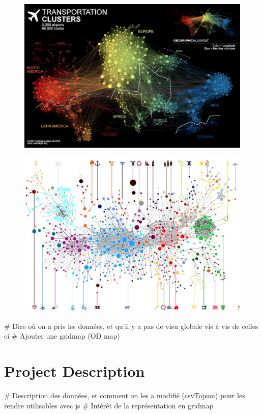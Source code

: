 \documentclass{vgtc}
\begin{document}
\begin{figure}[H]
\center
\includegraphics[scale=0.15]{airports-network-small.jpg}
\end{figure}

\begin{figure}[H]
\center
\includegraphics[scale=0.4]{economic_growth_atlas2.jpg}
\end{figure}

# Dire où on a pris les données, et qu'il y a pas de visu globale vis à vis de celles ci
# Ajouter une gridmap (OD map)

\section{Project Description}
# Description des données, et comment on les a modifié (csvTojson) pour les rendre utilisables avec js 
# Intérêt de la représentation en gridmap
\end{document}
